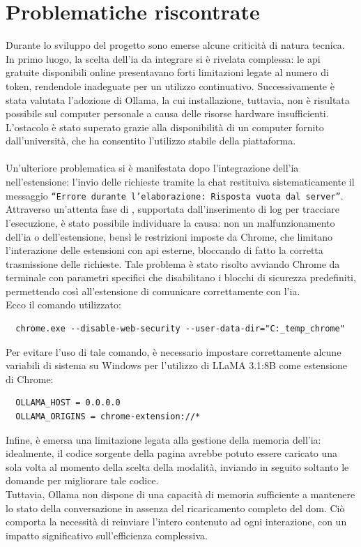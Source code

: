 \section{Problematiche riscontrate}
\noindent Durante lo sviluppo del progetto sono emerse alcune criticità di natura tecnica. In primo luogo, la scelta dell’\acrshort{ia} da integrare si è rivelata complessa: le \acrshort{api} gratuite disponibili online presentavano forti limitazioni legate al numero di token, rendendole inadeguate per un utilizzo continuativo. Successivamente è stata valutata l’adozione di Ollama, la cui installazione, tuttavia, non è risultata possibile sul computer personale a causa delle risorse hardware insufficienti. L’ostacolo è stato superato grazie alla disponibilità di un computer fornito dall’università, che ha consentito l’utilizzo stabile della piattaforma.\\\\
Un’ulteriore problematica si è manifestata dopo l’integrazione dell’\acrshort{ia} nell’estensione: l’invio delle richieste tramite la chat restituiva sistematicamente il messaggio \texttt{“Errore durante l’elaborazione: Risposta vuota dal server”}. Attraverso un’attenta fase di , supportata dall’inserimento di log per tracciare l’esecuzione, è stato possibile individuare la causa: non un malfunzionamento dell’\acrshort{ia} o dell'estensione, bensì le restrizioni imposte da Chrome, che limitano l’interazione delle estensioni con \acrshort{api} esterne, bloccando di fatto la corretta trasmissione delle richieste. Tale problema è stato risolto avviando Chrome da terminale con parametri specifici che disabilitano i blocchi di sicurezza predefiniti, permettendo così all’estensione di comunicare correttamente con l’\acrshort{ia}.\\
\noindent Ecco il comando utilizzato: 
\begin{verbatim} 
  chrome.exe --disable-web-security --user-data-dir="C:_temp_chrome" 
\end{verbatim}

\noindent Per evitare l’uso di tale comando, è necessario impostare correttamente alcune variabili di sistema su Windows per l’utilizzo di LLaMA 3.1:8B come estensione di Chrome: 
\begin{verbatim} 
  OLLAMA_HOST = 0.0.0.0 
  OLLAMA_ORIGINS = chrome-extension://* 
\end{verbatim} 

\vspace{0.3cm}
\noindent Infine, è emersa una limitazione legata alla gestione della memoria dell’\acrshort{ia}: idealmente, il codice sorgente della pagina avrebbe potuto essere caricato una sola volta al momento della scelta della modalità, inviando in seguito soltanto le domande per migliorare tale codice. \\Tuttavia, Ollama non dispone di una capacità di memoria sufficiente a mantenere lo stato della conversazione in assenza del ricaricamento completo del \acrshort{dom}. Ciò comporta la necessità di reinviare l’intero contenuto ad ogni interazione, con un impatto significativo sull’efficienza complessiva.
